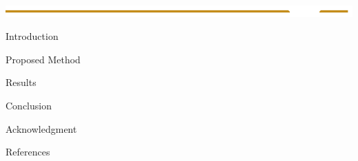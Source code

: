 \documentclass[paperwidth=48in,paperheight=42in,landscape]{preambles/baposter}
\begin{document}
\begin{poster}
{  \includegraphics[height=0.35\headerheight]{preambles/ucsdECE}


}


\begin{posterbox}[name=abstract,column=0]{Introduction}
%

\end{posterbox}

\begin{posterbox}[name=propsedMethod,column=1,span=2]{Proposed Method}

\end{posterbox}

\begin{posterbox}[name=results,column=1,below=propsedMethod]{Results}

\end{posterbox}

\begin{posterbox}[name=conclusion,column=2,below=propsedMethod]{Conclusion}

\end{posterbox}

\begin{posterbox}[name=acknowledgment,column=2,below=conclusion]{Acknowledgment}

\end{posterbox}

\begin{posterbox}[name=references,column=2,below=acknowledgment]{References}
\nocite{bal:cha:gra:pae}


\end{posterbox}

\end{poster}
\end{document}
